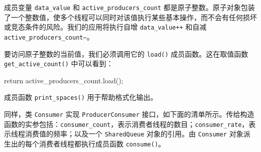 成员变量 \texttt{data\_\allowbreak{}value} 和 \texttt{active\_\allowbreak{}producers\_\allowbreak{}count} 都是原子整数。原子对象包装了一个整数值，使多个线程可以同时对该值执行某些基本操作，而不会有任何损坏或竞态条件的风险。我们的应用将执行自增 \texttt{data\_\allowbreak{}value+\allowbreak{}+\allowbreak{}} 和自减 \texttt{active\_\allowbreak{}producers\_\allowbreak{}count--}。

要访问原子整数的当前值，我们必须调用它的 \texttt{load()} 成员函数。这在取值函数 \texttt{get\_\allowbreak{}active\_\allowbreak{}count(\allowbreak{})\allowbreak{}} 中可以看到：

\begin{codebox}
return active_producers_count.load();
\end{codebox}

成员函数 \texttt{print\_\allowbreak{}spaces(\allowbreak{})\allowbreak{}} 用于帮助格式化输出。

同样，类 \texttt{Consumer} 实现 \texttt{Producer\allowbreak{}Consumer} 接口，如下面的清单所示。传给构造函数的实参包括：\texttt{consumer\_\allowbreak{}count}，表示消费者线程的数目；\texttt{consumer\_\allowbreak{}rate}，表示线程消费值的频率；以及一个 \texttt{Shared\allowbreak{}Queue} 对象的引用。由 \texttt{Consumer} 对象派生出的每个消费者线程都执行成员函数 \texttt{consume()}。

